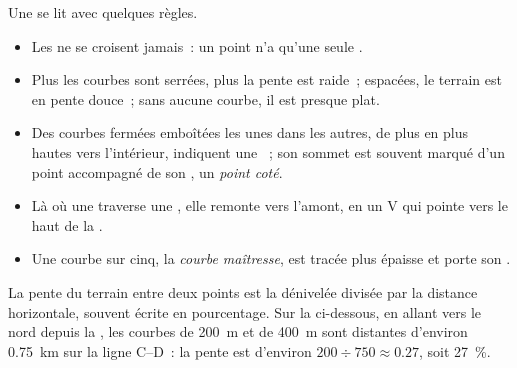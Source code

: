 Une  se lit avec quelques règles.
\begin{itemize}
  \item Les  ne se croisent jamais~: un point n'a qu'une
        seule .
  \item Plus les courbes sont serrées, plus la pente est raide~; espacées,
        le terrain est en pente douce~; sans aucune courbe, il est presque
        plat.
  \item Des courbes fermées emboîtées les unes dans les autres, de plus en
        plus hautes vers l'intérieur, indiquent une ~; son sommet est
        souvent marqué d'un point accompagné de son , un \emph{point coté}.
  \item Là où une  traverse une , elle remonte vers
        l'amont, en un V qui pointe vers le haut de la .
  \item Une courbe sur cinq, la \emph{courbe maîtresse}, est tracée plus
        épaisse et porte son .
\end{itemize}

La pente du terrain entre deux points est la dénivelée divisée par la
distance horizontale, souvent écrite en pourcentage. Sur la 
ci-dessous, en allant vers le nord depuis la , les courbes de
\qty{200}{m} et de \qty{400}{m} sont distantes d'environ \qty{0.75}{km}
sur la ligne C--D~: la pente est d'environ $200 \div 750
\approx 0.27$, soit \qty{27}{\%}.


